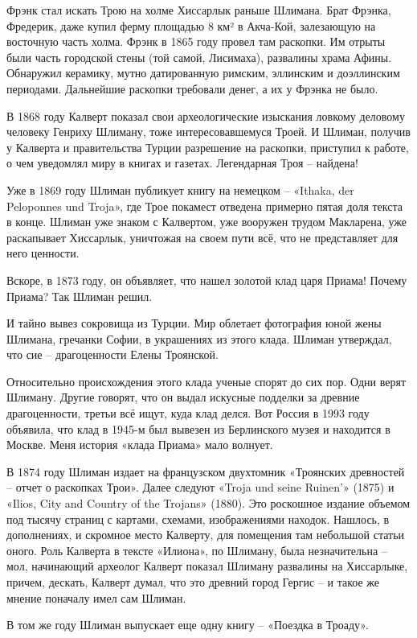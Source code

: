 Фрэнк стал искать Трою на холме Хиссарлык раньше Шлимана. Брат Фрэнка, Фредерик, даже купил ферму площадью 8 км² в Акча-Кой, залезающую на восточную часть холма. Фрэнк в 1865 году провел там раскопки. Им отрыты были часть городской стены (той самой, Лисимаха), развалины храма Афины. Обнаружил керамику, мутно датированную римским, эллинским и доэллинским периодами. Дальнейшие раскопки требовали денег, а их у Фрэнка не было.

В 1868 году Калверт показал свои археологические изыскания ловкому деловому человеку Генриху Шлиману, тоже интересовавшемуся Троей. И Шлиман, получив у Калверта и правительства Турции разрешение на раскопки, приступил к работе, о чем уведомлял миру в книгах и газетах. Легендарная Троя – найдена!

Уже в 1869 году Шлиман публикует книгу на немецком – «Ithaka, der Peloponnes und Troja», где Трое покамест отведена примерно пятая доля текста в конце. Шлиман уже знаком с Калвертом, уже вооружен трудом Макларена, уже раскапывает Хиссарлык, уничтожая на своем пути всё, что не представляет для него ценности.

Вскоре, в 1873 году, он объявляет, что нашел золотой клад царя Приама! Почему Приама? Так Шлиман решил.

И тайно вывез сокровища из Турции. Мир облетает фотография юной жены Шлимана, гречанки Софии, в украшениях из этого клада. Шлиман утверждал, что сие – драгоценности Елены Троянской.

Относительно происхождения этого клада ученые спорят до сих пор. Одни верят Шлиману. Другие говорят, что он выдал искусные подделки за древние драгоценности, третьи всё ищут, куда клад делся. Вот Россия в 1993 году объявила, что клад в 1945-м был вывезен из Берлинского музея и находится в Москве. Меня история «клада Приама» мало волнует.

В 1874 году Шлиман издает на французском двухтомник «Троянских древностей – отчет о раскопках Трои». Далее следуют «Troja und seine Ruinen'» (1875) и «Ilios, City and Country of the Trojans» (1880). Это роскошное издание объемом под тысячу страниц с картами, схемами, изображениями находок. Нашлось, в дополнениях, и скромное место Калверту, для помещения там небольшой статьи оного. Роль Калверта в тексте «Илиона», по Шлиману, была незначительна – мол, начинающий археолог Калверт показал Шлиману развалины на Хиссарлыке, причем, дескать, Калверт думал, что это древний город Гергис – и такое же мнение поначалу имел сам Шлиман.

В том же году Шлиман выпускает еще одну книгу – «Поездка в Троаду».

